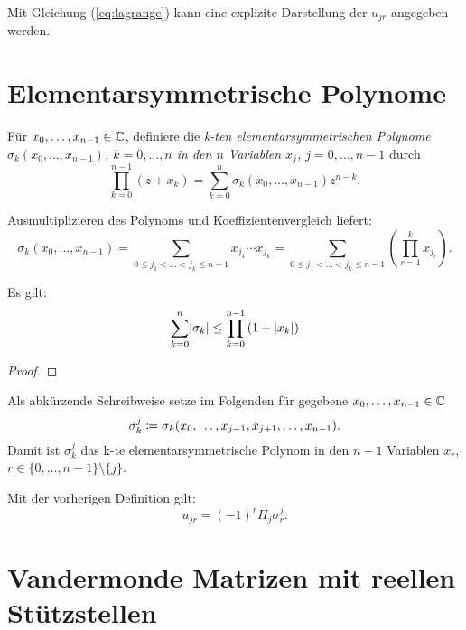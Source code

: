 Mit Gleichung (\ref{eq:lagrange}) kann eine explizite Darstellung der $u_{jr}$
angegeben werden.

\section{Elementarsymmetrische Polynome}
\begin{mydef}
    Für $x_0, \dots, x_{n-1} \in \mathbb{C}$, definiere die
    \emph{k-ten elementarsymmetrischen Polynome
    $\sigma_{k}(x_0, \dots, x_{n-1})$, $k = 0, \dots, n$
    in den $n$ Variablen $x_j$, $j = 0, \dots, n-1$} durch
    \[
        \prod_{k=0}^{n-1} (z + x_k)
        = \sum_{k=0}^{n} \sigma_{k}(x_0, \dots, x_{n-1}) z^{n-k}.
    \]
\end{mydef}

\begin{remark}
    Ausmultiplizieren des Polynoms und Koeffizientenvergleich liefert:
    \begin{equation*}
        \sigma_{k}(x_0, \dots, x_{n-1})
        = \sum_{0 \leq j_1 < \dots < j_k \leq n-1} x_{j_1} \cdots x_{j_k}
        = \sum_{0 \leq j_1 < \dots < j_k \leq n-1} \left( \prod_{r=1}^k x_{j_r} \right).
    \end{equation*}
\end{remark}

\begin{lemma}
    Es gilt:
    \begin{equation*}
        \sum_{k=0}^{n} \lvert\sigma_{k}\rvert \leq \prod_{k=0}^{n-1} \left( 1 + \lvert x_k\rvert \right)
    \end{equation*}
\end{lemma}

\begin{proof}
\end{proof}

\begin{notation}
    Als abkürzende Schreibweise setze im Folgenden für gegebene $x_0, \dots, x_{n-1} \in \mathbb{C}$
    \[
        \sigma_{k}^{j} \coloneqq \sigma_{k}(x_0, \dots, x_{j-1}, x_{j+1}, \dots, x_{n-1}).
    \]
    Damit ist $\sigma_{k}^{j}$ das k-te elementarsymmetrische Polynom in den
    $n-1$ Variablen $x_r$, $r \in \{ 0, \dots, n-1 \} \setminus \{ j \}$.
\end{notation}

\begin{remark}
    Mit der vorherigen Definition gilt:
    \begin{equation}
        u_{jr} = (-1)^{r} \Pi_j \sigma_{r}^{j}.
    \end{equation}
\end{remark}

\section{Vandermonde Matrizen mit reellen Stützstellen}
